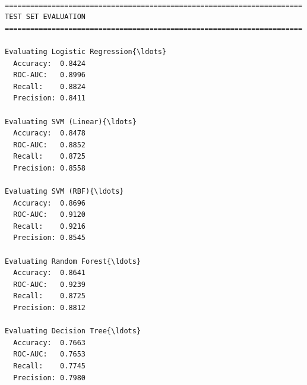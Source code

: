 \documentclass[11pt]{article}
\begin{document}
    \begin{Verbatim}[commandchars=\\\{\}]

======================================================================
TEST SET EVALUATION
======================================================================

Evaluating Logistic Regression{\ldots}
  Accuracy:  0.8424
  ROC-AUC:   0.8996
  Recall:    0.8824
  Precision: 0.8411

Evaluating SVM (Linear){\ldots}
  Accuracy:  0.8478
  ROC-AUC:   0.8852
  Recall:    0.8725
  Precision: 0.8558

Evaluating SVM (RBF){\ldots}
  Accuracy:  0.8696
  ROC-AUC:   0.9120
  Recall:    0.9216
  Precision: 0.8545

Evaluating Random Forest{\ldots}
  Accuracy:  0.8641
  ROC-AUC:   0.9239
  Recall:    0.8725
  Precision: 0.8812

Evaluating Decision Tree{\ldots}
  Accuracy:  0.7663
  ROC-AUC:   0.7653
  Recall:    0.7745
  Precision: 0.7980
    \end{Verbatim}
\end{document}
